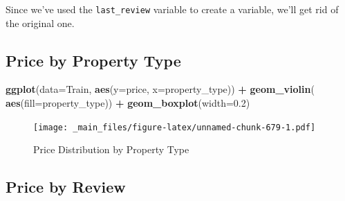 \documentclass[]{book}
\newenvironment{Shaded}{\begin{snugshade}}{\end{snugshade}}
\newcommand{\KeywordTok}[1]{\textcolor[rgb]{0.13,0.29,0.53}{\textbf{#1}}}
\newcommand{\DataTypeTok}[1]{\textcolor[rgb]{0.13,0.29,0.53}{#1}}
\newcommand{\FloatTok}[1]{\textcolor[rgb]{0.00,0.00,0.81}{#1}}
\newcommand{\StringTok}[1]{\textcolor[rgb]{0.31,0.60,0.02}{#1}}
\newcommand{\CommentTok}[1]{\textcolor[rgb]{0.56,0.35,0.01}{\textit{#1}}}
\newcommand{\OperatorTok}[1]{\textcolor[rgb]{0.81,0.36,0.00}{\textbf{#1}}}
\newcommand{\NormalTok}[1]{#1}
\begin{document}
Since we've used the \texttt{last\_review} variable to create a
variable, we'll get rid of the original one.

\begin{Shaded}
\end{Shaded}

\subsection{Price by Property Type}\label{price-by-property-type}

\begin{Shaded}
\begin{Highlighting}[]
\KeywordTok{ggplot}\NormalTok{(}\DataTypeTok{data=}\NormalTok{Train, }\KeywordTok{aes}\NormalTok{(}\DataTypeTok{y=}\NormalTok{price, }\DataTypeTok{x=}\NormalTok{property_type)) }\OperatorTok{+}\StringTok{ }\KeywordTok{geom_violin}\NormalTok{( }\KeywordTok{aes}\NormalTok{(}\DataTypeTok{fill=}\NormalTok{property_type)) }\OperatorTok{+}\StringTok{ }
\StringTok{  }\KeywordTok{geom_boxplot}\NormalTok{(}\DataTypeTok{width=}\FloatTok{0.2}\NormalTok{)}
\end{Highlighting}
\end{Shaded}

\begin{figure}
\centering
\texttt{[image: \_main\_files/figure-latex/unnamed-chunk-679-1.pdf]}
\caption{\label{fig:unnamed-chunk-679}Price Distribution by Property Type}
\end{figure}

\subsection{Price by Review}\label{price-by-review}

\begin{Shaded}
\end{Shaded}
\end{document}
